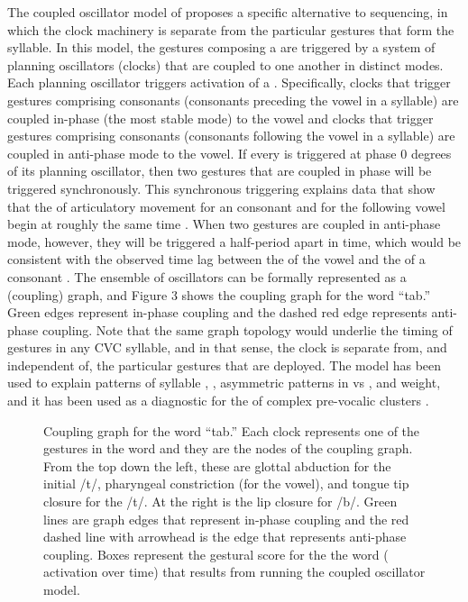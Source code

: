 \documentclass[output=paper,
modfonts
]{LSP/langsci}
\begin{document}
\newpage 
The coupled oscillator model of  \citep{Goldstein2006} proposes a specific alternative to  sequencing, in which the clock machinery is separate from the particular gestures that form the syllable. In this model, the gestures composing a  are triggered by a system of planning oscillators (clocks) that are coupled to one another in distinct modes. Each planning oscillator triggers activation of a . Specifically, clocks that trigger gestures comprising  consonants (consonants preceding the vowel in a syllable) are coupled in-phase (the most stable mode) to the vowel  and clocks that trigger gestures comprising  consonants (consonants following the vowel in a syllable) are coupled in anti-phase mode to the vowel. If every  is triggered at phase 0 degrees of its planning oscillator, then two gestures that are coupled in phase will be triggered synchronously. This synchronous triggering explains data that show that the  of articulatory movement for an  consonant and for the following vowel begin at roughly the same time \citep{Goldstein2006}.  When two gestures are coupled in anti-phase mode, however, they will be triggered a half-period apart in time, which would be consistent with the observed time lag between the  of the vowel  and the  of a  consonant  \citep{Goldstein2006}.   The ensemble of oscillators can be formally represented as a (coupling) graph, and Figure 3 shows the coupling graph for the word ``tab.'' Green edges represent in-phase coupling and the dashed red edge represents anti-phase coupling. Note that the same graph topology would underlie the timing of gestures in any CVC syllable, and in that sense, the clock is separate from, and independent of, the particular gestures that are deployed. The model has been used to explain patterns of syllable ,  \citep{Nam2009}, asymmetric  patterns in  vs  \citep{Marin2010}, and weight, and it has been used as a diagnostic for the  of complex pre-vocalic clusters \citep{Hermes2013, Shaw2009}. 


\begin{figure}[htpb]
\label{fig:clockworks}
\caption{Coupling graph for the word ``tab.'' Each clock represents one of the gestures in the word and they are the nodes of the coupling graph.  From the top down the left, these are glottal abduction for the initial /t/,  pharyngeal constriction (for the vowel), and tongue tip closure for the /t/. At the right is the lip closure for /b/.   Green lines are graph edges that represent in-phase coupling and the red dashed line with arrowhead is the edge that represents anti-phase coupling. Boxes represent the gestural score for the the word ( activation over time) that results from running the coupled oscillator model.}
\end{figure}
 
\end{document}
